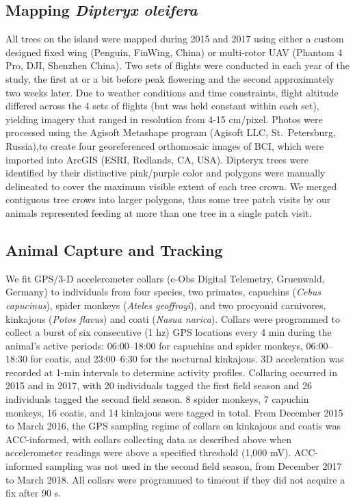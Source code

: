 \documentclass[twoside,12pt,final]{ucthesis-CA2012}
\begin{document}
\begin{ucmainmatter}
\hypertarget{mapping-dipteryx-oleifera}{%
\subsection{\texorpdfstring{Mapping \emph{Dipteryx oleifera}}{Mapping Dipteryx oleifera}}\label{mapping-dipteryx-oleifera}}

All trees on the island were mapped during 2015 and 2017 using either a custom designed fixed wing (Penguin, FinWing, China) or multi-rotor UAV (Phantom 4 Pro, DJI, Shenzhen China). Two sets of flights were conducted in each year of the study, the first at or a bit before peak flowering and the second approximately two weeks later. Due to weather conditions and time constraints, flight altitude differed across the 4 sets of flights (but was held constant within each set), yielding imagery that ranged in resolution from 4-15 cm/pixel. Photos were processed using the Agisoft Metashape program (Agisoft LLC, St.~Petersburg, Russia),to create four georeferenced orthomosaic images of BCI, which were imported into ArcGIS (ESRI, Redlands, CA, USA). Dipteryx trees were identified by their distinctive pink/purple color and polygons were manually delineated to cover the maximum visible extent of each tree crown. We merged contiguous tree crows into larger polygons, thus some tree patch visits by our animals represented feeding at more than one tree in a single patch visit.

\hypertarget{animal-capture-and-tracking}{%
\subsection{Animal Capture and Tracking}\label{animal-capture-and-tracking}}

We fit GPS/3-D accelerometer collars (e-Obs Digital Telemetry, Gruenwald, Germany) to individuals from four species, two primates, capuchins (\emph{Cebus capucinus}), spider monkeys (\emph{Ateles geoffroyi}), and two procyonid carnivores, kinkajous (\emph{Potos flavus}) and coati (\emph{Nasua narica}). Collars were programmed to collect a burst of six consecutive (1 hz) GPS locations every 4 min during the animal's active periods: 06:00--18:00 for capuchins and spider monkeys, 06:00--
18:30 for coatis, and 23:00--6:30 for the nocturnal kinkajous. 3D acceleration was recorded at 1-min intervals to determine activity profiles. Collaring occurred in 2015 and in 2017, with 20 individuals tagged the first field season and 26 individuals tagged the second field season. 8 spider monkeys, 7 capuchin monkeys, 16 coatis, and 14 kinkajous were tagged in total. From December 2015 to March 2016, the GPS sampling regime of collars on kinkajous and coatis was ACC-informed, with collars collecting data as described above when accelerometer readings were above a specified threshold (1,000 mV). ACC-informed sampling was not used in the second field season, from December 2017 to March 2018. All collars were programmed to timeout if they did not acquire a fix after 90 s.


\end{ucmainmatter}
\end{document}
